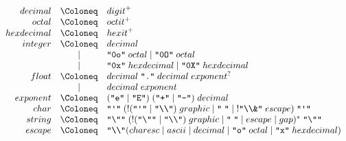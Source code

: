 \begin{align*}
  \begin{array}{rcl}
    {decimal}
    & \Coloneq & {digit}^+
    \\
    {octal}
    & \Coloneq & {octit}^+
    \\
    {hexdecimal}
    & \Coloneq & {hexit}^+
    \\
    {integer}
    & \Coloneq & {decimal} \\
    & \mid & \text{\texttt{\textquotedbl 0o\textquotedbl}}\; {octal} \mid \text{\texttt{\textquotedbl 0O\textquotedbl}}\; {octal} \\
    & \mid & \text{\texttt{\textquotedbl 0x\textquotedbl}}\; {hexdecimal} \mid \text{\texttt{\textquotedbl 0X\textquotedbl}}\; {hexdecimal}
    \\
    {float}
    & \Coloneq & {decimal}\; \text{\texttt{\textquotedbl .\textquotedbl}}\; {decimal}\; {exponent}^? \\
    & \mid & {decimal}\; {exponent}
    \\
    {exponent}
    & \Coloneq & (\text{\texttt{\textquotedbl e\textquotedbl}} \mid \text{\texttt{\textquotedbl E\textquotedbl}})\; (\text{\texttt{\textquotedbl +\textquotedbl}} \mid \text{\texttt{\textquotedbl -\textquotedbl}})\; {decimal}
    \\
    {char}
    & \Coloneq & \text{\texttt{\textquotedbl\textquotesingle\textquotedbl}}\;({!}(\text{\texttt{\textquotedbl\textquotesingle\textquotedbl}} \mid \text{\texttt{\textquotedbl\textbackslash\textbackslash\textquotedbl}})\; {graphic} \mid \text{\texttt{\textquotedbl\;\textquotedbl}} \mid {!}\text{\texttt{\textquotedbl\textbackslash\textbackslash\&\textquotedbl}}\; {escape}) \; \text{\texttt{\textquotedbl\textquotesingle\textquotedbl}}
    \\
    {string}
    & \Coloneq & \text{\texttt{\textquotedbl\textbackslash\textquotedbl\textquotedbl}}\;({!}(\text{\texttt{\textquotedbl\textbackslash\textquotedbl\textquotedbl}} \mid \text{\texttt{\textquotedbl\textbackslash\textbackslash\textquotedbl}})\; {graphic} \mid \text{\texttt{\textquotedbl\;\textquotedbl}} \mid {escape} \mid {gap})^* \; \text{\texttt{\textquotedbl\textbackslash\textquotedbl\textquotedbl}}
    \\
    {escape}
    & \Coloneq & \text{\texttt{\textquotedbl\textbackslash\textbackslash\textquotedbl}} ({charesc} \mid {ascii} \mid {decimal} \mid \text{\texttt{\textquotedbl o\textquotedbl}}\; {octal} \mid \text{\texttt{\textquotedbl x\textquotedbl}}\; {hexdecimal})
    \\

\end{array}
\end{align*}
